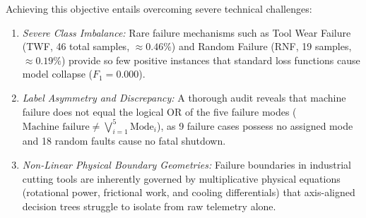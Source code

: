 \documentclass[conference]{IEEEtran}
\begin{document}
Achieving this objective entails overcoming severe technical challenges:
\begin{enumerate}
    \item \textit{Severe Class Imbalance:} Rare failure mechanisms such as Tool Wear Failure (TWF, 46 total samples, $\approx 0.46\%$) and Random Failure (RNF, 19 samples, $\approx 0.19\%$) provide so few positive instances that standard loss functions cause model collapse ($F_1 = 0.000$).
    \item \textit{Label Asymmetry and Discrepancy:} A thorough audit reveals that machine failure does not equal the logical OR of the five failure modes ($\text{Machine failure} \neq \bigvee_{i=1}^5 \text{Mode}_i$), as 9 failure cases possess no assigned mode and 18 random faults cause no fatal shutdown.
    \item \textit{Non-Linear Physical Boundary Geometries:} Failure boundaries in industrial cutting tools are inherently governed by multiplicative physical equations (rotational power, frictional work, and cooling differentials) that axis-aligned decision trees struggle to isolate from raw telemetry alone.
\end{enumerate}
\end{document}
